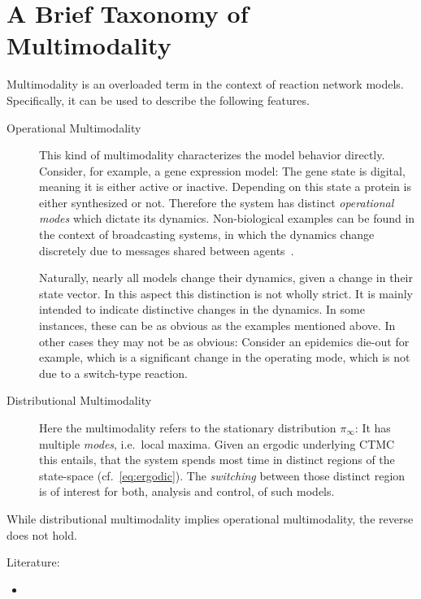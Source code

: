 \section{A Brief Taxonomy of Multimodality}\label{sec:multimodality}
Multimodality is an overloaded term in the context of reaction network models.
Specifically, it can be used to describe the following features.
\begin{description}
	\item[Operational Multimodality]
		This kind of multimodality characterizes the model behavior directly.
		Consider, for example, a gene
		expression model:
		The gene state is digital, meaning it is either active or inactive.
		Depending on this state a protein is either synthesized or not.
		Therefore the system has distinct \emph{operational modes}
		which dictate its dynamics.
		Non-biological examples can be found in the
		context of broadcasting systems,
		in which the dynamics change discretely due to messages shared between
		agents~\cite{bortolussi2020fluid}.

		Naturally, nearly all models change their dynamics,
		given a change in their state vector.
		In this aspect this distinction is not wholly strict.
		It is mainly intended to indicate distinctive changes in the dynamics.
		In some instances, these can be as obvious as the examples mentioned above.
		In other cases they may not be as obvious:
		Consider an epidemics die-out for example, which is a significant change
		in the operating mode, which is not due to a switch-type reaction.
  \item[Distributional Multimodality]
	  Here the multimodality refers to the stationary distribution $\pi_{\infty}$:
		It has multiple
		\emph{modes}, i.e.\ local maxima. Given an ergodic underlying \ac{CTMC}
		this entails, that the system spends most time in distinct regions of the
		state-space (cf.\ \eqref{eq:ergodic}).
		The \emph{switching} between those distinct region is of interest
		for both, analysis and control, of such models.
\end{description}
While distributional multimodality implies operational multimodality, the reverse
does not hold.

Literature:
\begin{itemize}
	\item \cite{siegal2011emergence}
\end{itemize}
